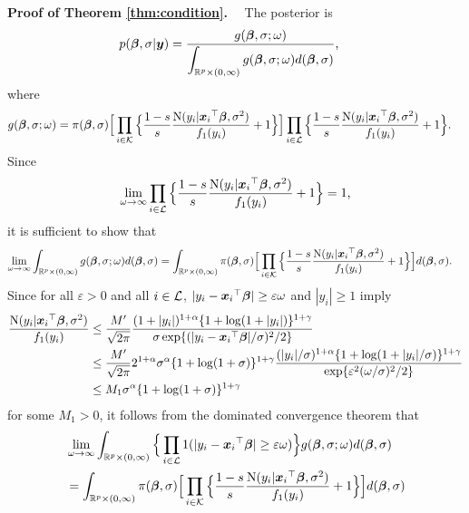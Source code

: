 \documentclass[12pt]{article}
\def\ep{{\varepsilon}}
\def\si{{\sigma}}
\def\al{{\alpha}}
\def\ga{{\gamma}}
\def\ep{{\varepsilon}}
\def\si{{\sigma}}
\def\om{{\omega}}
\def\non{{\nonumber}}
\def\Lc{{\cal L}}
\def\Kc{{\cal K}}
\def\al{{\alpha}}
\def\ga{{\gamma}}
\def\ep{{\varepsilon}}
\def\si{{\sigma}}
\def\om{{\omega}}
\def\bbe{{\text{\boldmath $\beta$}}}
\def\x{{\text{\boldmath $x$}}}
\def\y{{\text{\boldmath $y$}}}
\def\Lc{{\cal L}}
\def\Kc{{\cal K}}
\def\non{{\nonumber}}
\begin{document}
\noindent
{\bf Proof of Theorem \ref{thm:condition}.} \ \ The posterior is 
\begin{align}
p( \bbe , \si | \y ) &= \frac{ \displaystyle g( \bbe , \si ; \om ) }{ \displaystyle \int_{\mathbb{R} ^p \times (0, \infty )} g( \bbe , \si ; \om ) d( \bbe , \si ) } \text{,} \non 
\end{align}
where 
\begin{align}
g( \bbe , \si ; \om ) %
&= \pi ( \bbe , \si ) \Big[ \prod_{i \in \Kc } \Big\{ {1 - s \over s} {{\rm{N}} ( y_i | {\x _i}^{\top } \bbe , \si ^2 ) \over f_1 ( y_i )} + 1 \Big\} \Big] \prod_{i \in \Lc } \Big\{ {1 - s \over s} {{\rm{N}} ( y_i | {\x _i}^{\top } \bbe , \si ^2 ) \over f_1 ( y_i )} + 1 \Big\} \text{.} \non 
\end{align}
Since 
\begin{align}
\lim_{\om \to \infty } \prod_{i \in \Lc } \Big\{ {1 - s \over s} {{\rm{N}} ( y_i | {\x _i}^{\top } \bbe , \si ^2 ) \over f_1 ( y_i )} + 1 \Big\} = 1 \text{,} \non 
\end{align}
it is sufficient to show that 
\begin{align}
\lim_{\om \to \infty } \int_{\mathbb{R} ^p \times (0, \infty )} g( \bbe , \si ; \om ) d( \bbe , \si ) &= \int_{\mathbb{R} ^p \times (0, \infty )} \pi ( \bbe , \si ) \Big[ \prod_{i \in \Kc } \Big\{ {1 - s \over s} {{\rm{N}} ( y_i | {\x _i}^{\top } \bbe , \si ^2 ) \over f_1 ( y_i )} + 1 \Big\} \Big] d( \bbe , \si ) \text{.} \non 
\end{align}
Since for all $\ep > 0$ and all $i \in \Lc $, $| y_i - {\x _i}^{\top } \bbe | \ge \ep \om $ and $| y_i | \ge 1$ imply 
\begin{align}
{{\rm{N}} ( y_i | {\x _i}^{\top } \bbe , \si ^2 ) \over f_1 ( y_i )} &\le {M' \over \sqrt{2 \pi }} {(1 + | y_i |)^{1 + \al } \{ 1 + \log (1 + | y_i |) \} ^{1 + \ga } \over \si \exp \{ (| y_i - {\x _i}^{\top } \bbe | / \si )^2 / 2 \} } \non \\
&\le {M' \over \sqrt{2 \pi }} 2^{1 + \al } \si ^{\al } \{ 1 + \log (1 + \si ) \} ^{1 + \ga } {(| y_i | / \si )^{1 + \al } \{ 1 + \log (1 + | y_i | / \si ) \} ^{1 + \ga } \over \exp \{ \ep ^2 ( \om / \si )^2 / 2 \} } \non \\
&\le M_1 \si ^{\al } \{ 1 + \log (1 + \si ) \} ^{1 + \ga } \non 
\end{align}
for some $M_1 > 0$, it follows from the dominated convergence theorem that 
\begin{align}
&\lim_{\om \to \infty } \int_{\mathbb{R} ^p \times (0, \infty )} \Big\{ \prod_{i \in \Lc } 1(| y_i - {\x _i}^{\top } \bbe | \ge \ep \om ) \Big\} g( \bbe , \si ; \om ) d( \bbe , \si ) \non \\
&= \int_{\mathbb{R} ^p \times (0, \infty )} \pi ( \bbe , \si ) \Big[ \prod_{i \in \Kc } \Big\{ {1 - s \over s} {{\rm{N}} ( y_i | {\x _i}^{\top } \bbe , \si ^2 ) \over f_1 ( y_i )} + 1 \Big\} \Big] d( \bbe , \si ) \non 
\end{align}
\end{document}
